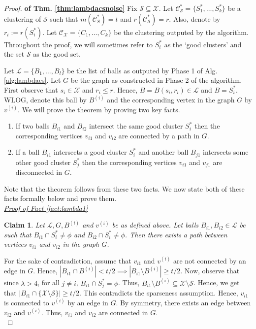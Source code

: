 \documentclass[anon,12pt]{colt2016} %
\newtheorem{claim}[theorem]{Claim}
\newcommand{\mc}{\mathcal}
\begin{document}
\begin{proof}\textbf{ of Thm. \ref{thm:lambdacsnoise}}
Fix $\mc S \subseteq \mc X$. Let $\mc C_{\mc S}^* = \{S_1^*, \ldots, S_k^*\}$ be a clustering of $\mc S$ such that $m( \mc C_{S}^*) = t$ and $r(\mc C_{\mc S}^*) = r$. Also, denote by $r_i := r(S_i^*)$. Let $\mc C_{\mc X} = \{C_1, \ldots, C_k\}$ be the clustering outputed by the algorithm. Throughout the proof, we will sometimes refer to $S_i^*$ as the `good clusters' and the set $\mc S$ as the good set.

Let $\mc L = \{B_1, \ldots, B_l\}$ be the list of balls as outputed by Phase 1 of Alg. \ref{alg:lambdacs}. Let $G$ be the graph as constructed in Phase 2 of the algorithm. First observe that $s_i \in \mc X$ and $r_i \le r$. Hence, $B = B(s_i, r_i) \in \mc L$ and $B = S_i^*$. WLOG, denote this ball by $B^{(i)}$ and the corresponding vertex in the graph $G$ by $v^{(i)}$. We will prove the theorem by proving two key facts.  

\begin{enumerate}[nolistsep, noitemsep, label=\textbf{F.\arabic*}]
\renewcommand\labelitemi{$\diamond$}
\item \label{fact:lambda1} If two balls $B_{i1}$ and $B_{i2}$ intersect the same good cluster $S_i^*$ then the corresponding vertices $v_{i1}$ and $v_{i2}$ are connected by a path in $G$.
\item \label{fact:lambda2} If a ball $B_{i1}$ intersects a good cluster $S_i^*$ and another ball $B_{j1}$ intersects some other good cluster $S_j^*$ then the corresponding vertices $v_{i1}$ and $v_{j1}$ are disconnected in $G$.	
\end{enumerate}
Note that the theorem follows from these two facts. We now state both of these facts formally below and prove them.\\

\noindent\textit{\underline{Proof of Fact \ref{fact:lambda1}}}
\begin{claim}
\label{claim:lambda1}
Let $\mc L, G, B^{(i)}$ and $v^{(i)}$ be as defined above. Let balls $B_{i1}, B_{i2} \in \mc L$ be such that $B_{i1} \cap S_i^* \neq \phi$ and $B_{i2} \cap S_i^* \neq \phi$. Then there exists a path between vertices $v_{i1}$ and $v_{i2}$ in the graph $G$.
\end{claim}
\vspace{-0.1in} For the sake of contradiction, assume that $v_{i1}$ and $v^{(i)}$ are not connected by an edge in $G$. Hence, $|B_{i1} \cap B^{(i)}| < t/2 \implies |B_{i1} \setminus B^{(i)}| \ge t/2$. Now, observe that since $\lambda > 4$, for all $j \neq i$, $B_{i1} \cap S_j^* = \phi$. Thus, $B_{i1} \setminus B^{(i)} \subseteq \mc X \setminus \mc S$. Hence, we get that $|B_{i1} \cap \{\mc X \setminus \mc S\}| \ge t/2$. This contradicts the sparseness assumption. Hence, $v_{i1}$ is connected to $v^{(i)}$ by an edge in $G$. By symmetry, there exists an edge between $v_{i2}$ and $v^{(i)}$. Thus, $v_{i1}$ and $v_{i2}$ are connected in $G$.\\


\end{proof}
\end{document}
